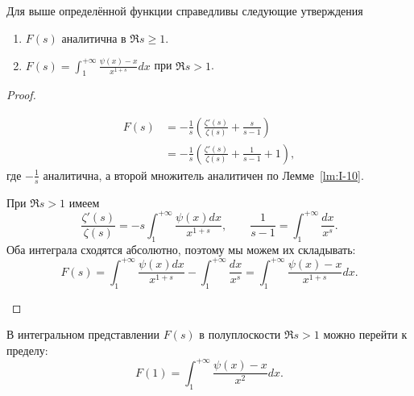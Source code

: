 \begin{nlemma}
\label{lm:I-11}
    Для выше определённой функции справедливы следующие утверждения
    \begin{enumerate}
        \item $F(s)$ аналитична в $\Re{s} \ge 1$.
        \item $F(s) = \int_{1}^{+\infty} \frac{\psi(x) - x}{x^{1+s}}dx$ при $\Re{s} > 1$.
    \end{enumerate}
\end{nlemma}
\begin{proof}
    \hfill
    \begin{statesp}
        \item
            \begin{align*}
                F(s) &= -\frac{1}{s}\left( \frac{\zeta'(s)}{\zeta(s)} + \frac{s}{s-1} \right) \\
                &= -\frac{1}{s}\left( \frac{\zeta'(s)}{\zeta(s)} + \frac{1}{s-1} + 1 \right),
            \end{align*}
            где $-\frac{1}{s}$ аналитична, а второй множитель аналитичен по Лемме~\ref{lm:I-10}.
        \item
            При $\Re{s} > 1$ имеем
            \[
                \frac{\zeta'(s)}{\zeta(s)} = 
                -s\int_{1}^{+\infty} \frac{\psi(x)dx}{x^{1+s}},
                \qquad
                \frac{1}{s-1} = \int_{1}^{+\infty}\frac{dx}{x^s}.
            \]
            Оба интеграла сходятся абсолютно, поэтому мы можем их складывать:
            \[
                F(s) = \int_{1}^{+\infty}\frac{\psi(x)dx}{x^{1+s}} - \int_{1}^{+\infty} \frac{dx}{x^s} = \int_{1}^{+\infty} \frac{\psi(x)-x}{x^{1+s}}dx.
            \]
    \end{statesp}
\end{proof}

\begin{ntheorem}
\label{thm:I-7}
    В интегральном представлении $F(s)$ в полуплоскости $\Re{s} > 1$ можно перейти к пределу:
    \[
        F(1) = \int_{1}^{+\infty} \frac{\psi(x) - x}{x^2}dx.
    \]
\end{ntheorem}

